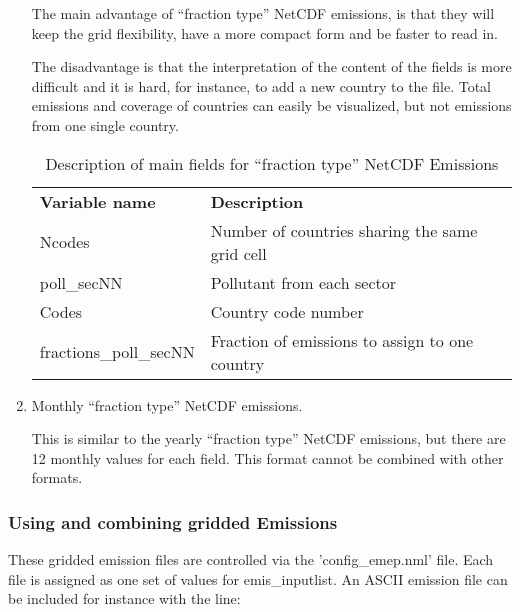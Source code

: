 \begin{enumerate}
The main advantage of ``fraction type'' NetCDF emissions, is that they
will keep the grid flexibility, have a more compact form and be faster
to read in. 

The disadvantage is that the interpretation of the content of the
fields is more difficult and it is hard, for instance, to add a new
country to the file. Total emissions and coverage of countries can
easily be visualized, but not emissions from one single country. 



\begin{table}
\caption{Description of main fields for ``fraction type'' NetCDF Emissions}
\label{Tab:Emisdata}
\begin{center}
\begin{tabular}{lll}
\hline

{\bf Variable name } & {\bf Description}\\

Ncodes & Number of countries sharing the same grid cell\\
poll\_secNN & Pollutant from each sector \\
Codes & Country code number \\
fractions\_poll\_secNN & Fraction of emissions to assign to one country\\

\hline

\end{tabular}
\end{center}
\end{table}





\item Monthly ``fraction type'' NetCDF emissions.

This is similar to the yearly ``fraction type'' NetCDF emissions, but
there are 12 monthly values for each field. This format cannot be
combined with other formats. 

\end{enumerate}

\subsubsection{Using and combining gridded Emissions}

These gridded emission files are controlled via the 'config\_emep.nml' file.
Each file is assigned as one set of values for emis\_inputlist.
An ASCII emission file can be included for instance with the line:

